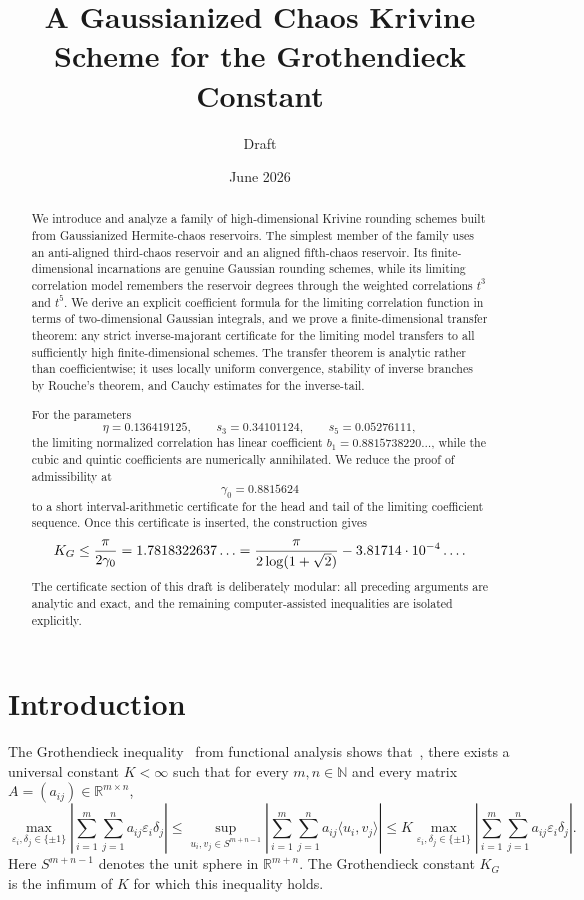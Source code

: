 \documentclass[11pt]{article}
\title{A Gaussianized Chaos Krivine Scheme for the Grothendieck Constant}
\author{Draft}
\date{June 2026}
\newcommand{\R}{\mathbb R}
\newcommand{\N}{\mathbb N}
\newcommand{\1}{\mathbf 1}
\newcommand{\ip}[2]{\langle #1,#2\rangle}
\newcommand{\KG}{K_G}
\newcommand{\gammazero}{\gamma_0}
\newcommand{\eps}{\varepsilon}
\theoremstyle{plain}
\theoremstyle{definition}
\theoremstyle{remark}
\begin{document}
\maketitle

\begin{abstract}
We introduce and analyze a family of high-dimensional Krivine rounding schemes built from Gaussianized Hermite-chaos reservoirs.  The simplest member of the family uses an anti-aligned third-chaos reservoir and an aligned fifth-chaos reservoir.  Its finite-dimensional incarnations are genuine Gaussian rounding schemes, while its limiting correlation model remembers the reservoir degrees through the weighted correlations \(t^3\) and \(t^5\).  We derive an explicit coefficient formula for the limiting correlation function in terms of two-dimensional Gaussian integrals, and we prove a finite-dimensional transfer theorem: any strict inverse-majorant certificate for the limiting model transfers to all sufficiently high finite-dimensional schemes.  The transfer theorem is analytic rather than coefficientwise; it uses locally uniform convergence, stability of inverse branches by Rouche's theorem, and Cauchy estimates for the inverse-tail.

For the parameters
\[
  \eta=0.136419125,\qquad s_3=0.34101124,\qquad s_5=0.05276111,
\]
the limiting normalized correlation has linear coefficient \(b_1=0.8815738220\ldots\), while the cubic and quintic coefficients are numerically annihilated.  We reduce the proof of admissibility at
\[
  \gammazero=0.8815624
\]
to a short interval-arithmetic certificate for the head and tail of the limiting coefficient sequence.  Once this certificate is inserted, the construction gives
\[
  \KG \le {\pi\over 2\gammazero}
  =1.7818322637\ldots
  ={\pi\over 2\log(1+\sqrt2)}-3.81714\cdot 10^{-4}\ldots .
\]
The certificate section of this draft is deliberately modular: all preceding arguments are analytic and exact, and the remaining computer-assisted inequalities are isolated explicitly.
\end{abstract}


\section{Introduction}

The Grothendieck inequality~\cite{Grothendieck1953} from functional analysis shows that~\cite{LindenstraussPelczynski1968}, there exists a universal constant $K<\infty$ such that for every $m,n\in\N$ and every matrix $A=(a_{ij})\in\R^{m\times n}$,
\begin{equation}\label{eq:grothendieck-ineq}
  \max_{\eps_i,\delta_j\in\{\pm1\}}
  \left|\sum_{i=1}^m\sum_{j=1}^n a_{ij}\eps_i\delta_j\right|
  \le
  \sup_{u_i,v_j\in S^{m+n-1}}
  \left|\sum_{i=1}^m\sum_{j=1}^n a_{ij}\ip{u_i}{v_j}\right|
  \le
  K\max_{\eps_i,\delta_j\in\{\pm1\}}
  \left|\sum_{i=1}^m\sum_{j=1}^n a_{ij}\eps_i\delta_j\right|.
\end{equation}
Here $S^{m+n-1}$ denotes the unit sphere in $\R^{m+n}$. The Grothendieck constant $\KG$ is the infimum of $K$ for which this inequality holds.
\end{document}
